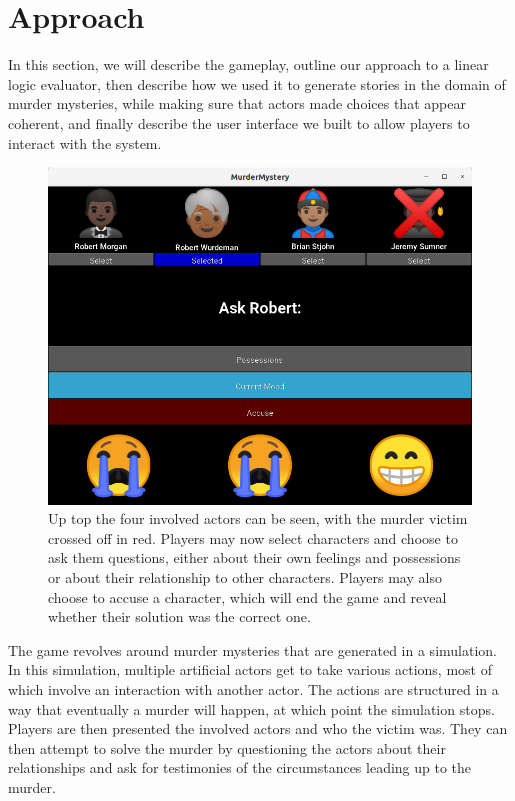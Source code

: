 \section{Approach} \label{approach}

In this section, we will describe the gameplay, outline our approach to a linear logic evaluator, then describe how we used it to generate stories in the domain of murder mysteries, while making sure that actors made choices that appear coherent, and finally describe the user interface we built to allow players to interact with the system.

\begin{figure}
  \includegraphics[width=\columnwidth]{ui.png}
  \caption{Up top the four involved actors can be seen, with the murder victim crossed off in red. Players may now select characters and choose to ask them questions, either about their own feelings and possessions or about their relationship to other characters. Players may also choose to accuse a character, which will end the game and reveal whether their solution was the correct one.}
  \label{fig:ui}
\end{figure}

The game revolves around murder mysteries that are generated in a simulation.
In this simulation, multiple artificial actors get to take various actions, most of which involve an interaction with another actor.
The actions are structured in a way that eventually a murder will happen, at which point the simulation stops.
Players are then presented the involved actors and who the victim was.
They can then attempt to solve the murder by questioning the actors about their relationships and ask for testimonies of the circumstances leading up to the murder.

